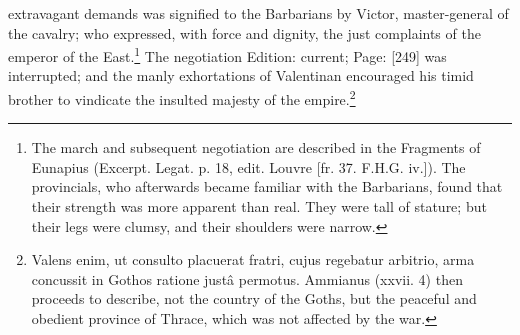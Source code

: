 extravagant demands was signified to the Barbarians by Victor, master-general of the cavalry; who expressed, with force and dignity, the just complaints of the emperor of the East.\footnote{The march and subsequent negotiation are described in the Fragments of Eunapius (Excerpt. Legat. p. 18, edit. Louvre [fr. 37. F.H.G. iv.]). The provincials, who afterwards became familiar with the Barbarians, found that their strength was more apparent than real. They were tall of stature; but their legs were clumsy, and their shoulders were narrow.} The negotiation Edition: current; Page: [249] was interrupted; and the manly exhortations of Valentinan encouraged his timid brother to vindicate the insulted majesty of the empire.\footnote{Valens enim, ut consulto placuerat fratri, cujus regebatur arbitrio, arma concussit in Gothos ratione justâ permotus. Ammianus (xxvii. 4) then proceeds to describe, not the country of the Goths, but the peaceful and obedient province of Thrace, which was not affected by the war.}

